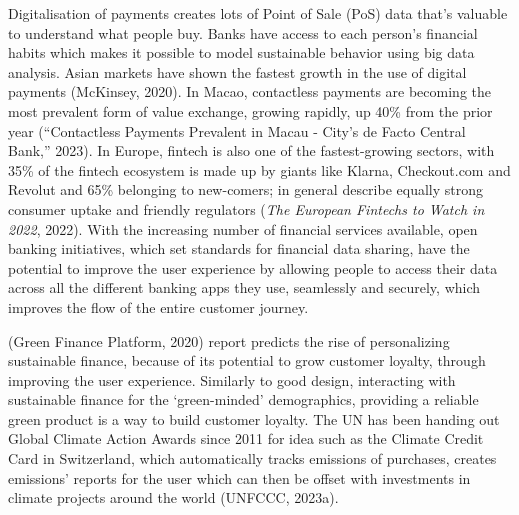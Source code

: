 \documentclass[
  12pt,
  letterpaper,
  DIV=11,
  numbers=noendperiod]{scrartcl}
\begin{document}
Digitalisation of payments creates lots of Point of Sale (PoS) data
that's valuable to understand what people buy. Banks have access to each
person's financial habits which makes it possible to model sustainable
behavior using big data analysis. Asian markets have shown the fastest
growth in the use of digital payments (McKinsey, 2020). In Macao,
contactless payments are becoming the most prevalent form of value
exchange, growing rapidly, up 40\% from the prior year ({``Contactless
Payments Prevalent in {Macau} - {City}'s de Facto Central Bank,''}
2023). In Europe, fintech is also one of the fastest-growing sectors,
with 35\% of the fintech ecosystem is made up by giants like Klarna,
Checkout.com and Revolut and 65\% belonging to new-comers; in general
describe equally strong consumer uptake and friendly regulators
(\emph{The {European} Fintechs to Watch in 2022}, 2022). With the
increasing number of financial services available, open banking
initiatives, which set standards for financial data sharing, have the
potential to improve the user experience by allowing people to access
their data across all the different banking apps they use, seamlessly
and securely, which improves the flow of the entire customer journey.

(Green Finance Platform, 2020) report predicts the rise of personalizing
sustainable finance, because of its potential to grow customer loyalty,
through improving the user experience. Similarly to good design,
interacting with sustainable finance for the `green-minded'
demographics, providing a reliable green product is a way to build
customer loyalty. The UN has been handing out Global Climate Action
Awards since 2011 for idea such as the Climate Credit Card in
Switzerland, which automatically tracks emissions of purchases, creates
emissions' reports for the user which can then be offset with
investments in climate projects around the world (UNFCCC, 2023a).
\end{document}
